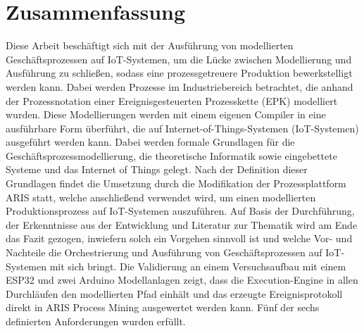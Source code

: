 \chapter*{Zusammenfassung}

Diese Arbeit beschäftigt sich mit der Ausführung von modellierten Geschäftsprozessen auf IoT-Systemen, um die Lücke zwischen Modellierung und Ausführung zu schließen, sodass eine prozessgetreuere Produktion bewerkstelligt werden kann. Dabei werden Prozesse im Industriebereich betrachtet, die anhand der Prozessnotation einer Ereignisgesteuerten Prozesskette (EPK) modelliert wurden. Diese Modellierungen werden mit einem eigenen Compiler in eine ausführbare Form überführt, die auf Internet-of-Things-Systemen (IoT-Systemen) ausgeführt werden kann. Dabei werden formale Grundlagen für
die Geschäftsprozessmodellierung, die theoretische Informatik sowie eingebettete Systeme und das Internet of Things gelegt.
Nach der Definition dieser Grundlagen findet die Umsetzung durch die Modifikation der Prozessplattform ARIS statt, welche anschließend verwendet wird,
um einen modellierten Produktionsprozess auf IoT-Systemen auszuführen. Auf Basis der Durchführung, der Erkenntnisse aus der Entwicklung und Literatur zur Thematik wird am Ende das Fazit gezogen, inwiefern solch ein Vorgehen sinnvoll ist und welche Vor- und Nachteile die Orchestrierung und Ausführung 
von Geschäftsprozessen auf IoT-Systemen mit sich bringt.
Die Validierung an einem Versuchsaufbau mit einem ESP32 und zwei Arduino Modellanlagen zeigt, dass die Execution-Engine in allen Durchläufen den modellierten Pfad einhält und das erzeugte Ereignisprotokoll direkt in ARIS Process Mining ausgewertet werden kann. Fünf der sechs definierten Anforderungen wurden erfüllt.
